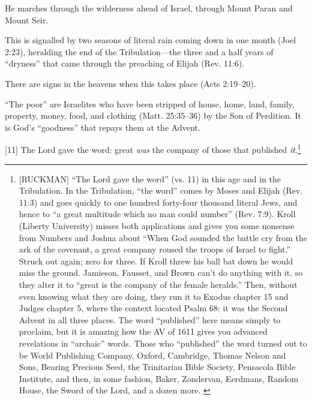 {\begin{compactenum}
\item He marches through the wilderness ahead of Israel, through Mount Paran and Mount Seir.
\item This is signalled by two seasons of literal rain coming down in one month (Joel 2:23), heralding the end of the Tribulation—the three and a half years of “dryness” that came through the preaching of Elijah (Rev. 11:6).
\item There are signs in the heavens when this takes place (Acts 2:19--20).
\item “The poor” are Israelites who have been stripped of house, home, land, family, property, money, food, and clothing (Matt. 25:35--36) by the Son of Perdition. It is God’s “goodness” that repays them at the Advent.
\end{compactenum}}
[11] \textcolor[rgb]{0.00,0.00,1.00}{The Lord gave the word: great \emph{was} the company of those that published \emph{it}.}\footnote{[RUCKMAN] “The Lord gave the word” (vs. 11) in this age and in the Tribulation. In the Tribulation, “the word” comes by Moses and Elijah (Rev. 11:3) and goes quickly to one hundred forty-four thousand literal Jews, and hence to “a great multitude which no man could number” (Rev. 7:9). Kroll (Liberty University) misses both applications and gives you some nonsense from Numbers and Joshua about “When God sounded the battle cry from the ark of the covenant, a great company roused the troops of Israel to fight.” Struck out again; zero for three. If Kroll threw his ball bat down he would miss the ground. Jamieson, Fausset, and Brown can’t do anything with it, so they alter it to “great is the company of the female heralds.” Then, without even knowing what they are doing, they run it to Exodus chapter 15 and Judges chapter 5, where the context located Psalm 68: it was the Second Advent in all three places. The word “published” here means simply to proclaim, but it is amazing how the AV of 1611 gives you advanced revelations in “archaic” words. Those who “published” the word turned out to be World Publishing Company, Oxford, Cambridge, Thomas Nelson and Sons, Bearing Precious Seed, the Trinitarian Bible Society, Pensacola Bible Institute, and then, in some fashion, Baker, Zondervan, Eerdmans, Random House, the Sword of the Lord, and a dozen more.  \cite{Ruckman1992Psalms}   }
